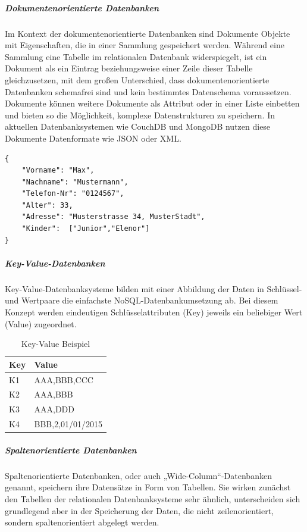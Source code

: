 \noindent
\subparagraph{Dokumentenorientierte Datenbanken}
Im Kontext der dokumentenorientierte Datenbanken sind Dokumente Objekte mit Eigenschaften, die in einer Sammlung gespeichert werden. 
Während eine Sammlung eine Tabelle im relationalen Datenbank widerspiegelt, ist ein Dokument als ein Eintrag beziehungsweise einer Zeile dieser Tabelle gleichzusetzen, mit dem großen Unterschied, dass dokumentenorientierte Datenbanken schemafrei sind und kein bestimmtes Datenschema voraussetzen. 
Dokumente können weitere Dokumente als Attribut oder in einer Liste einbetten und bieten so die Möglichkeit, komplexe Datenstrukturen zu speichern.  
In aktuellen Datenbanksystemen wie CouchDB und MongoDB nutzen diese Dokumente Datenformate wie JSON oder XML. 

\begin{lstlisting}
{
	"Vorname": "Max",
	"Nachname": "Mustermann",
	"Telefon-Nr": "0124567",
	"Alter": 33,
	"Adresse": "Musterstrasse 34, MusterStadt",
	"Kinder":  ["Junior","Elenor"]
}
\end{lstlisting}

\noindent
\subparagraph{Key-Value-Datenbanken}
Key-Value-Datenbanksysteme bilden mit einer Abbildung der Daten in Schlüssel- und Wertpaare die einfachste NoSQL-Datenbankumsetzung ab. Bei diesem Konzept werden eindeutigen Schlüsselattributen (Key) jeweils ein beliebiger Wert (Value) zugeordnet. 

\begin{table}[tbt]
\caption{Key-Value Beispiel}
\begin{center}
    \begin{tabular}{ l  l }
	\toprule
    \textbf{Key} & \textbf{Value} \\
    \midrule
    K1 & AAA,BBB,CCC\\
    

    K2 &  AAA,BBB\\


	K3 & AAA,DDD\\


    K4 & BBB,2,01/01/2015 \\
	\bottomrule
    \end{tabular}
\end{center}
\end{table}

\noindent
\subparagraph{Spaltenorientierte Datenbanken}
Spaltenorientierte Datenbanken, oder auch „Wide-Column“-Datenbanken genannt, speichern ihre Datensätze in Form von Tabellen.  Sie wirken zunächst den Tabellen der relationalen Datenbanksysteme sehr ähnlich, unterscheiden sich grundlegend aber in der Speicherung der Daten, die nicht zeilenorientiert, sondern spaltenorientiert abgelegt werden. 


